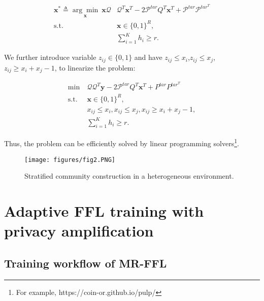 \documentclass[lettersize,journal]{IEEEtran}
\begin{document}
\begin{equation}
\begin{aligned}
\mathbf{x}^*\triangleq\underset{\mathbf{x}}{\arg \min}\ \mathbf{x}\mathcal{Q} &\mathcal{Q}^T\mathbf{x}^T-2\mathcal{P}^{tar}Q^T\mathbf{x}^T+\mathcal{P}^{tar}\mathcal{P}^{tar^T}\\
\text{s.t. }&\mathbf{x}\in\{0,1\}^R,\\
&\sum_{i=1} ^K h_i\geq r.
\end{aligned}
\end{equation}

We further introduce variable $z_{ij} \in \{0,1\}$ and have $z_{ij}\leq x_i$,$z_{ij}\leq x_j$,$z_{ij}\geq x_i+x_j-1$, to linearize the problem:

\begin{equation}%
\begin{aligned}
\min\ &\mathcal{Q}\mathcal{Q}^T\mathbf{y}-2\mathcal{P}^{tar}Q^T\mathbf{x}^T+P^{tar}P^{tar^T}\\
\text{s.t. }& \mathbf{x}\in\{0,1\}^R,
\\
&x_{ij}\leq x_i, x_{ij}\leq x_j, x_{ij}\geq x_i+x_j-1,
\\&\sum_{i=1} ^K h_i\geq r.
\end{aligned}
\end{equation}

Thus, the problem can be efficiently solved by linear programming solvers\footnote{For example, https://coin-or.github.io/pulp/}. 

\begin{figure}[!t]
\centering
\texttt{[image: figures/fig2.PNG]}
\caption{Stratified community construction in a heterogeneous environment.}
\label{fig2:framework}
\end{figure}

\section{Adaptive FFL training with privacy amplification}
\subsection{Training workflow of MR-FFL}
\end{document}
